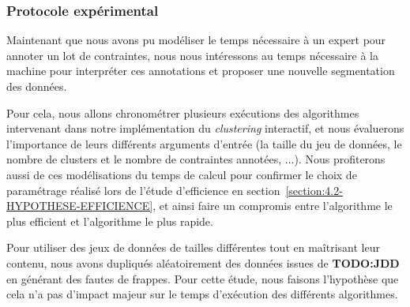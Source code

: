 		\subsubsection{Protocole expérimental}
		
			Maintenant que nous avons pu modéliser le temps nécessaire à un expert pour annoter un lot de contraintes, nous nous intéressons au temps nécessaire à la machine pour interpréter ces annotations et proposer une nouvelle segmentation des données.
			
			Pour cela, nous allons chronométrer plusieurs exécutions des algorithmes intervenant dans notre implémentation du \textit{clustering} interactif, et nous évaluerons l'importance de leurs différents arguments d'entrée (la taille du jeu de données, le nombre de clusters et le nombre de contraintes annotées, ...).
			Nous profiterons aussi de ces modélisations du temps de calcul pour confirmer le choix de paramétrage réalisé lors de l'étude d'efficience en section~\ref{section:4.2-HYPOTHESE-EFFICIENCE}, et ainsi faire un compromis entre l'algorithme le plus efficient et l'algorithme le plus rapide.
			
			\begin{leftBarWarning}
				Pour utiliser des jeux de données de tailles différentes tout en maîtrisant leur contenu, nous avons dupliqués aléatoirement des données issues de \textbf{TODO:JDD} en générant des fautes de frappes.
				Pour cette étude, nous faisons l'hypothèse que cela n'a pas d'impact majeur sur le temps d'exécution des différents algorithmes.
			\end{leftBarWarning}
			
